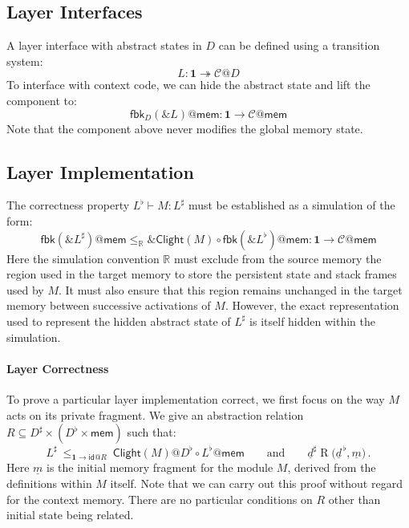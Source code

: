 \documentclass[acmsmall,screen,review,anonymous]{acmart}
\newcommand{\kw}[1]{\ensuremath{ \mathsf{#1} }}
\newcommand{\intl}[1]{\underline{#1}}
\begin{document}
\subsection{Layer Interfaces} %

A layer interface with abstract states in $D$
can be defined using a transition system:
\[
  L : \mathbf{1} \twoheadrightarrow \mathcal{C}@D
\]
To interface with context code,
we can hide the abstract state and lift the component to:
\[
  \kw{fbk}_D(\&L)@\kw{mem} : \mathbf{1} \rightarrow \mathcal{C}@\kw{mem}
\]
Note that the component above never modifies the global memory state.


\subsection{Layer Implementation} %

The correctness property $L^\flat \vdash M : L^\sharp$
must be established as a simulation of the form:
\[
  \kw{fbk}(\&L^\sharp)@\kw{mem}
  \le_\mathbb{R}
  \&\kw{Clight}(M) \circ \kw{fbk}(\&L^\flat)@\kw{mem}
  :
  \mathbf{1} \rightarrow \mathcal{C}@\kw{mem}
\]
Here the simulation convention $\mathbb{R}$
must exclude from the source memory
the region used in the target memory
to store the persistent state and stack frames used by $M$.
It must also ensure that
this region remains unchanged in the target memory
between successive activations of $M$.
However,
the exact representation used
to represent the hidden abstract state of $L^\sharp$
is itself hidden within the simulation.

\paragraph{Layer Correctness}

To prove a particular layer implementation correct,
we first focus on the way $M$ acts on its private fragment.
We give an abstraction relation
$R \subseteq D^\sharp \times (D^\flat \times \kw{mem})$
such that:
\begin{equation}
  L^\sharp
  \:\le_{\mathbf{1} \rightarrow \kw{id}@R}\:
  \kw{Clight}(M)@D^\flat \circ L^\flat@\kw{mem}
  \qquad \text{and} \qquad
  \intl{d}^\sharp \mathrel{R} \big( \intl{d}^{\,\flat}, \intl{m} \big)
  \,.
  \label{eqn:lc}
\end{equation}
Here $\intl{m}$ is the initial memory fragment for the module $M$,
derived from the definitions within $M$ itself.
Note that we can carry out this proof without regard for the context memory.
There are no particular conditions on $R$ other than
initial state being related.
\end{document}
